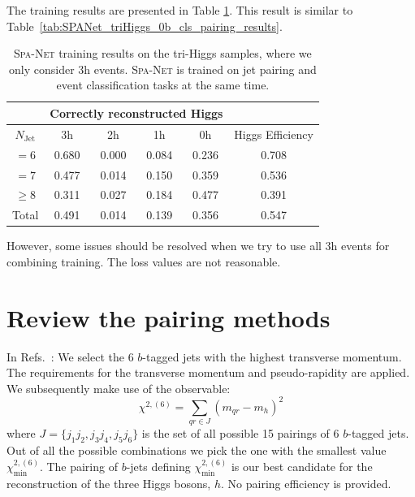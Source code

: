 \documentclass[12pt]{article}
\begin{document}
		The training results are presented in Table \ref{tab:SPANet_triHiggs_0b_3h_cls_pairing_results}. This result is similar to Table~\ref{tab:SPANet_triHiggs_0b_cls_pairing_results}.

		\begin{table}[htpb]
			\centering
			\caption{\textsc{Spa-Net} training results on the tri-Higgs samples, where we only consider 3h events. \textsc{Spa-Net} is trained on jet pairing and event classification tasks at the same time.}
			\label{tab:SPANet_triHiggs_0b_3h_cls_pairing_results}
			\begin{tabular}{c|cccc|c}
			\multicolumn{1}{l|}{} & \multicolumn{4}{c|}{Correctly reconstructed Higgs} & \multicolumn{1}{l}{} \\ \hline
			$N_\text{Jet}$        & 3h          & 2h         & 1h         & 0h         & Higgs Efficiency     \\ \hline
			$=6$                  & 0.680       & 0.000      & 0.084      & 0.236      & 0.708                \\
			$=7$                  & 0.477       & 0.014      & 0.150      & 0.359      & 0.536                \\
			$\ge 8$               & 0.311       & 0.027      & 0.184      & 0.477      & 0.391                \\ \hline
			Total                 & 0.491       & 0.014      & 0.139      & 0.356      & 0.547               
			\end{tabular}
			
		\end{table}

        However, some issues should be resolved when we try to use all 3h events for combining training. The loss values are not reasonable.
\section{Review the pairing methods}%
\label{sec:review_the_pairing_methods}
	In Refs.~\cite{Papaefstathiou:2019ofh, Papaefstathiou:2023uum}: We select the 6 $b$-tagged jets with the highest transverse momentum. The requirements for the transverse momentum and pseudo-rapidity are applied. We subsequently make use of the observable:
	\begin{equation}
		\chi^{2,(6)} = \sum_{qr\in J} (m_{qr} - m_h)^2
	\end{equation}
	where $J = \{j_1j_2,j_3j_4,j_5j_6\} $ is the set of all possible 15 pairings of 6 $b$-tagged jets. Out of all the possible combinations we pick the one with the smallest value $\chi_{\text{min}}^{2,(6)}$. The pairing of $b$-jets defining $\chi_{\text{min}}^{2,(6)}$ is our best candidate for the reconstruction of the three Higgs bosons, $h$. No pairing efficiency is provided.
\end{document}

